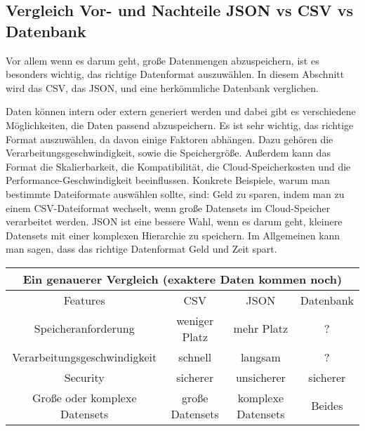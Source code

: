 \subsection{Vergleich Vor- und Nachteile JSON vs CSV vs Datenbank}
Vor allem wenn es darum geht, große Datenmengen abzuspeichern, ist es besonders wichtig, das richtige Datenformat auszuwählen. In diesem Abschnitt wird das CSV, das JSON, und eine herkömmliche Datenbank verglichen. 

Daten können intern oder extern generiert werden und dabei gibt es verschiedene Möglichkeiten, die Daten passend abzuspeichern. Es ist sehr wichtig, das richtige Format auszuwählen, da davon einige Faktoren abhängen. Dazu gehören die Verarbeitungsgeschwindigkeit, sowie die Speichergröße. 
Außerdem kann das Format die Skalierbarkeit, die Kompatibilität, die Cloud-Speicherkosten und die Performance-Geschwindigkeit beeinflussen. 
Konkrete Beispiele, warum man bestimmte Dateiformate auswählen sollte, sind: Geld zu sparen, indem man zu einem CSV-Dateiformat wechselt, wenn große Datensets im Cloud-Speicher verarbeitet werden. JSON ist eine bessere Wahl, wenn es darum geht, kleinere Datensets mit einer komplexen Hierarchie zu speichern. 
Im Allgemeinen kann man sagen, dass das richtige Datenformat Geld und Zeit spart.  

\begin{center}
    \begin{tabular}{ |c|c|c|c| } 
     \hline
     \multicolumn{4}{|c|}{Ein genauerer Vergleich (exaktere Daten kommen noch) } \\
     \hline
     \hline
     Features & CSV & JSON & Datenbank \\ 
     \hline 
     \hline
     Speicheranforderung & weniger Platz & mehr Platz & ? \\ 
     \hline
     Verarbeitungsgeschwindigkeit & schnell & langsam & ? \\ 
     \hline
     Security & sicherer & unsicherer & sicherer \\ 
     \hline
     Große oder komplexe Datensets & große Datensets & komplexe Datensets & Beides \\ 
     \hline
    \end{tabular}
    \end{center}

